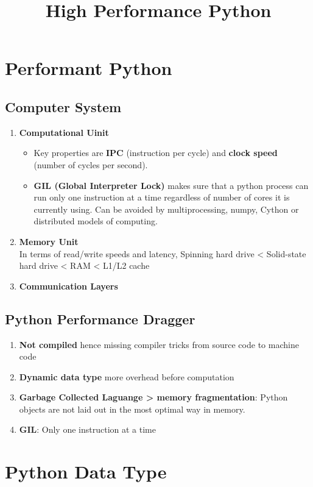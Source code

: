 \documentclass{article}
\title{High Performance Python } %
\begin{document}
\maketitle
\tableofcontents


\section{Performant Python}
	
	\subsection{Computer System}
		\begin{enumerate}
			\item {\bf Computational Uinit} 
				\begin{itemize}
					\item Key properties are {\bf IPC} (instruction per cycle) and {\bf clock speed} (number of cycles per second).
					\item {\bf GIL (Global Interpreter Lock)} makes sure that a python process can run only one instruction at a time regardless of number of cores it is currently using. Can be avoided by multiprocessing, numpy, Cython or distributed models of computing.
				\end{itemize}
			\item {\bf Memory Unit} 
				\\ In terms of read/write speeds and latency, Spinning hard drive < Solid-state hard drive < RAM < L1/L2 cache
			\item {\bf Communication Layers}
		\end{enumerate}
	\subsection{Python Performance Dragger}
		\begin{enumerate}
			\item {\bf Not compiled} hence missing compiler tricks from source code to machine code
			\item {\bf Dynamic data type} more overhead before computation
			\item {\bf Garbage Collected Laguange \-> memory fragmentation}: Python objects are not laid out in the most optimal way in memory.
			\item {\bf GIL}: Only one instruction at a time
		\end{enumerate}


\section{Python Data Type}
	
\end{document}
